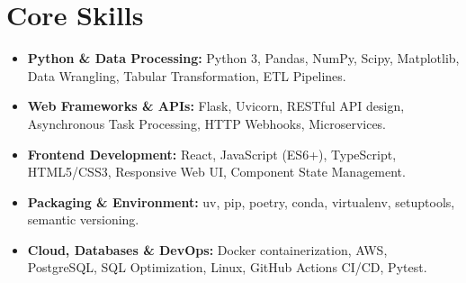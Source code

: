 \documentclass[a4paper,10pt]{article}
\begin{document}
\section{Core Skills}
\begin{itemize}
  \item \textbf{Python \& Data Processing:} Python 3, Pandas, NumPy, Scipy, Matplotlib, Data Wrangling, Tabular Transformation, ETL Pipelines.
  \item \textbf{Web Frameworks \& APIs:} Flask, Uvicorn, RESTful API design, Asynchronous Task Processing, HTTP Webhooks, Microservices.
  \item \textbf{Frontend Development:} React, JavaScript (ES6+), TypeScript, HTML5/CSS3, Responsive Web UI, Component State Management.
  \item \textbf{Packaging \& Environment:} uv, pip, poetry, conda, virtualenv, setuptools, semantic versioning.
  \item \textbf{Cloud, Databases \& DevOps:} Docker containerization, AWS, PostgreSQL, SQL Optimization, Linux, GitHub Actions CI/CD, Pytest.
\end{itemize}
\end{document}
